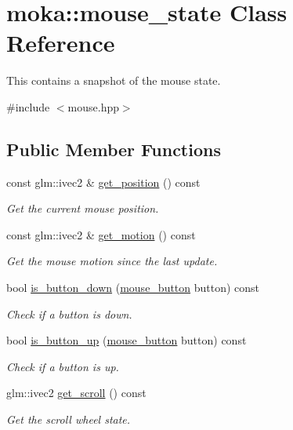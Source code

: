 \hypertarget{classmoka_1_1mouse__state}{}\section{moka\+::mouse\+\_\+state Class Reference}
\label{classmoka_1_1mouse__state}


This contains a snapshot of the mouse state.  




{\ttfamily \#include $<$mouse.\+hpp$>$}

\subsection*{Public Member Functions}
\begin{DoxyCompactItemize}
\item 
const glm\+::ivec2 \& \mbox{\hyperlink{classmoka_1_1mouse__state_a873347ca6732afcd9b6460552a0db814}{get\+\_\+position}} () const
\begin{DoxyCompactList}\small\item\em Get the current mouse position. \end{DoxyCompactList}\item 
const glm\+::ivec2 \& \mbox{\hyperlink{classmoka_1_1mouse__state_af0019c5bd6a56786c5595a183291aa06}{get\+\_\+motion}} () const
\begin{DoxyCompactList}\small\item\em Get the mouse motion since the last update. \end{DoxyCompactList}\item 
bool \mbox{\hyperlink{classmoka_1_1mouse__state_ab8e986486e66977f9c1ff159c9a707cd}{is\+\_\+button\+\_\+down}} (\mbox{\hyperlink{namespacemoka_a6abad6bcde3e62228759441d067533a0}{mouse\+\_\+button}} button) const
\begin{DoxyCompactList}\small\item\em Check if a button is down. \end{DoxyCompactList}\item 
bool \mbox{\hyperlink{classmoka_1_1mouse__state_a2ab33cf0358f5ff9912799d9fe625596}{is\+\_\+button\+\_\+up}} (\mbox{\hyperlink{namespacemoka_a6abad6bcde3e62228759441d067533a0}{mouse\+\_\+button}} button) const
\begin{DoxyCompactList}\small\item\em Check if a button is up. \end{DoxyCompactList}\item 
glm\+::ivec2 \mbox{\hyperlink{classmoka_1_1mouse__state_a0bd1e8df67a32d04ba914d8f756087d2}{get\+\_\+scroll}} () const
\begin{DoxyCompactList}\small\item\em Get the scroll wheel state. \end{DoxyCompactList}\end{DoxyCompactItemize}
